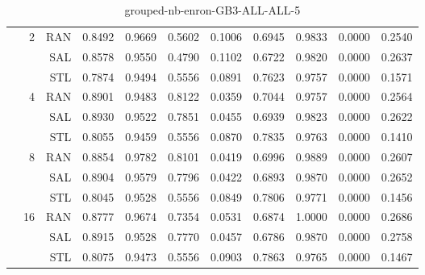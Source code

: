 \begin{center}
\begin{table}[htbp]
\begin{tabular}{ | r | r | r | r | r | r | r | r | r | r | r |}
 & \multirow{3}{*}{2} & RAN & 0.8492 & 0.9669 & 0.5602 & 0.1006 & 0.6945 & 0.9833 & 0.0000 & 0.2540\\ \cline{3-11}
 &   & SAL & 0.8578 & 0.9550 & 0.4790 & 0.1102 & 0.6722 & 0.9820 & 0.0000 & 0.2637\\ \cline{3-11}
 &   & STL & 0.7874 & 0.9494 & 0.5556 & 0.0891 & 0.7623 & 0.9757 & 0.0000 & 0.1571\\ \cline{2-11}
 & \multirow{3}{*}{4} & RAN & 0.8901 & 0.9483 & 0.8122 & 0.0359 & 0.7044 & 0.9757 & 0.0000 & 0.2564\\ \cline{3-11}
 &   & SAL & 0.8930 & 0.9522 & 0.7851 & 0.0455 & 0.6939 & 0.9823 & 0.0000 & 0.2622\\ \cline{3-11}
 &   & STL & 0.8055 & 0.9459 & 0.5556 & 0.0870 & 0.7835 & 0.9763 & 0.0000 & 0.1410\\ \cline{2-11}
 & \multirow{3}{*}{8} & RAN & 0.8854 & 0.9782 & 0.8101 & 0.0419 & 0.6996 & 0.9889 & 0.0000 & 0.2607\\ \cline{3-11}
 &   & SAL & 0.8904 & 0.9579 & 0.7796 & 0.0422 & 0.6893 & 0.9870 & 0.0000 & 0.2652\\ \cline{3-11}
 &   & STL & 0.8045 & 0.9528 & 0.5556 & 0.0849 & 0.7806 & 0.9771 & 0.0000 & 0.1456\\ \cline{2-11}
 & \multirow{3}{*}{16} & RAN & 0.8777 & 0.9674 & 0.7354 & 0.0531 & 0.6874 & 1.0000 & 0.0000 & 0.2686\\ \cline{3-11}
 &   & SAL & 0.8915 & 0.9528 & 0.7770 & 0.0457 & 0.6786 & 0.9870 & 0.0000 & 0.2758\\ \cline{3-11}
 &   & STL & 0.8075 & 0.9473 & 0.5556 & 0.0903 & 0.7863 & 0.9765 & 0.0000 & 0.1467\\ \cline{2-11}
\hline
\end{tabular}
\caption{grouped-nb-enron-GB3-ALL-ALL-5}
\end{table}
\end{center}

